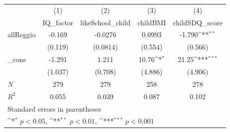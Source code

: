 {
\def\sym#1{\ifmmode^{#1}\else\(^{#1}\)\fi}
\begin{tabular}{l*{4}{c}}
\toprule
            &\multicolumn{1}{c}{(1)}&\multicolumn{1}{c}{(2)}&\multicolumn{1}{c}{(3)}&\multicolumn{1}{c}{(4)}\\
            &\multicolumn{1}{c}{IQ\_factor}&\multicolumn{1}{c}{likeSchool\_child}&\multicolumn{1}{c}{childBMI}&\multicolumn{1}{c}{childSDQ\_score}\\
\midrule
allReggio   &      -0.169         &     -0.0276         &      0.0993         &      -1.790\sym{**} \\
            &     (0.119)         &    (0.0814)         &     (0.554)         &     (0.566)         \\
\addlinespace
\_cons      &      -1.291         &       1.211         &       10.76\sym{*}  &       21.25\sym{***}\\
            &     (1.037)         &     (0.708)         &     (4.886)         &     (4.906)         \\
\midrule
\(N\)       &         279         &         279         &         258         &         278         \\
\(R^{2}\)   &       0.055         &       0.039         &       0.087         &       0.102         \\
\bottomrule
\multicolumn{5}{l}{\footnotesize Standard errors in parentheses}\\
\multicolumn{5}{l}{\footnotesize \sym{*} \(p<0.05\), \sym{**} \(p<0.01\), \sym{***} \(p<0.001\)}\\
\end{tabular}
}
